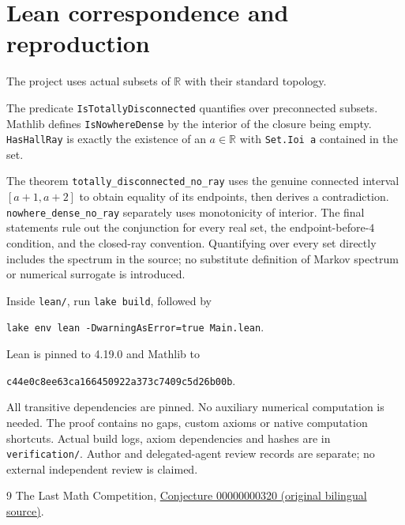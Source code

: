 \documentclass[11pt]{article}
\begin{document}
\section*{Lean correspondence and reproduction}
The project uses actual subsets of $\mathbb R$ with their standard topology.

The predicate \texttt{IsTotallyDisconnected} quantifies over preconnected subsets. Mathlib defines \texttt{IsNowhereDense} by the interior of the closure being empty. \texttt{HasHallRay} is exactly the existence of an $a\in\mathbb R$ with \texttt{Set.Ioi a} contained in the set.

The theorem \texttt{totally\_disconnected\_no\_ray} uses the genuine connected interval $[a+1,a+2]$ to obtain equality of its endpoints, then derives a contradiction. \texttt{nowhere\_dense\_no\_ray} separately uses monotonicity of interior. The final statements rule out the conjunction for every real set, the endpoint-before-$4$ condition, and the closed-ray convention. Quantifying over every set directly includes the spectrum in the source; no substitute definition of Markov spectrum or numerical surrogate is introduced.

Inside \texttt{lean/}, run \texttt{lake build}, followed by
\begin{center}\texttt{lake env lean -DwarningAsError=true Main.lean}.\end{center}
Lean is pinned to 4.19.0 and Mathlib to
\begin{center}\small\texttt{c44e0c8ee63ca166450922a373c7409c5d26b00b}.\end{center}
All transitive dependencies are pinned. No auxiliary numerical computation is needed. The proof contains no gaps, custom axioms or native computation shortcuts. Actual build logs, axiom dependencies and hashes are in \texttt{verification/}. Author and delegated-agent review records are separate; no external independent review is claimed.

\begin{thebibliography}{9}
 The Last Math Competition,
\href{https://github.com/The-Last-Math-Competition/The-Last-Math-Competition/blob/main/conjectures/00000000320.md}{Conjecture 00000000320 (original bilingual source)}.
\end{thebibliography}
\end{document}
